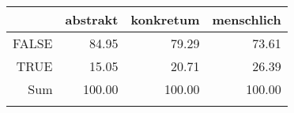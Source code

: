 \begin{tabular}{rrrr}
  \lsptoprule
 & abstrakt & konkretum & menschlich \\ 
  \midrule
FALSE & 84.95 & 79.29 & 73.61 \\ 
  TRUE & 15.05 & 20.71 & 26.39 \\ 
  Sum & 100.00 & 100.00 & 100.00 \\ 
   \lspbottomrule
\end{tabular}
